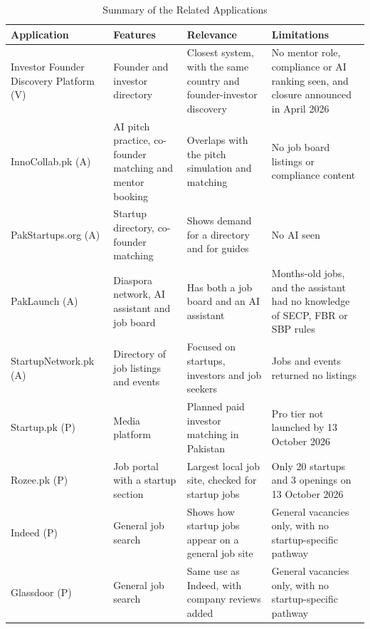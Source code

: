 \documentclass{FastFyp}
\begin{document}
\begin{table}[!ht]
\centering
\caption{Summary of the Related Applications}
\small
\setlength{\tabcolsep}{3pt}
\renewcommand{\arraystretch}{1.25}
\begin{tabular}{|p{2.6cm}|p{3.6cm}|p{3.9cm}|p{3.9cm}|}
\hline
\textbf{Application} & \textbf{Features} & \textbf{Relevance} & \textbf{Limitations} \\
\hline
Investor Founder Discovery Platform (V) \cite{ref:ifdp} & Founder and investor directory & Closest system, with the same country and founder-investor discovery & No mentor role, compliance or AI ranking seen, and closure announced in April 2026 \\
\hline
InnoCollab.pk (A) \cite{ref:innocollab} & AI pitch practice, co-founder matching and mentor booking & Overlaps with the pitch simulation and matching & No job board listings or compliance content \\
\hline
PakStartups.org (A) \cite{ref:pakstartups} & Startup directory, co-founder matching & Shows demand for a directory and for guides & No AI seen \\
\hline
PakLaunch (A) \cite{ref:paklaunch} & Diaspora network, AI assistant and job board & Has both a job board and an AI assistant & Months-old jobs, and the assistant had no knowledge of SECP, FBR or SBP rules \\
\hline
StartupNetwork.pk (A) \cite{ref:startupnetwork} & Directory of job listings and events & Focused on startups, investors and job seekers & Jobs and events returned no listings \\
\hline
Startup.pk (P) \cite{ref:startuppk} & Media platform & Planned paid investor matching in Pakistan & Pro tier not launched by 13 October 2026 \\
\hline
Rozee.pk (P) \cite{ref:rozee} & Job portal with a startup section & Largest local job site, checked for startup jobs & Only 20 startups and 3 openings on 13 October 2026 \\
\hline
Indeed (P) \cite{ref:indeed} & General job search & Shows how startup jobs appear on a general job site & General vacancies only, with no startup-specific pathway \\
\hline
Glassdoor (P) \cite{ref:glassdoor} & General job search & Same use as Indeed, with company reviews added & General vacancies only, with no startup-specific pathway \\
\hline
\end{tabular}
\label{tab:lr-applications}
\end{table}
\end{document}
